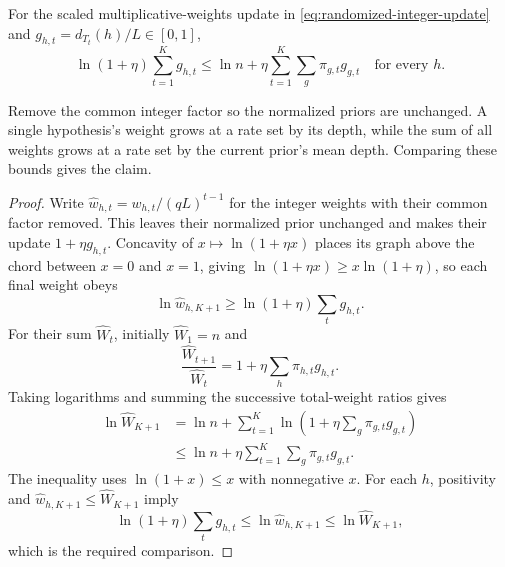 \begin{claim}
\label{clm:randomized-weight-growth}
For the scaled multiplicative-weights update in
\eqref{eq:randomized-integer-update} and
$g_{h,t}=d_{T_t}(h)/L\in[0,1]$,
\[
 \ln(1+\eta)\sum_{t=1}^Kg_{h,t}
 \le\ln n+\eta\sum_{t=1}^K\sum_g\pi_{g,t}g_{g,t}
 \quad\text{for every }h.
\]
\end{claim}
\begin{proofstrategy}
Remove the common integer factor so the normalized priors are
unchanged. A single hypothesis's weight grows at a rate set by its
depth, while the sum of all weights grows at a rate set by the current
prior's mean depth. Comparing these bounds gives the claim.
\end{proofstrategy}
\begin{proof}
Write $\widehat w_{h,t}=w_{h,t}/(qL)^{t-1}$ for the integer weights
with their common factor removed. This leaves their normalized
prior unchanged and makes their update $1+\eta g_{h,t}$.
Concavity of $x\mapsto\ln(1+\eta x)$ places its graph above the
chord between $x=0$ and $x=1$, giving
$\ln(1+\eta x)\ge x\ln(1+\eta)$, so each final weight obeys
\[
 \ln\widehat w_{h,K+1}\ge\ln(1+\eta)\sum_tg_{h,t}.
\]
For their sum $\widehat W_t$, initially $\widehat W_1=n$ and
\[
 \frac{\widehat W_{t+1}}{\widehat W_t}
    =1+\eta\sum_h\pi_{h,t}g_{h,t}.
\]
Taking logarithms and summing the successive total-weight ratios gives
\[
\begin{aligned}
 \ln\widehat W_{K+1}
 &=\ln n+\sum_{t=1}^K
          \ln\left(1+\eta\sum_g\pi_{g,t}g_{g,t}\right)\\
 &\le\ln n+\eta\sum_{t=1}^K\sum_g\pi_{g,t}g_{g,t}.
\end{aligned}
\]
The inequality uses $\ln(1+x)\le x$ with nonnegative $x$.
For each $h$, positivity and
$\widehat w_{h,K+1}\le\widehat W_{K+1}$ imply
\[
 \ln(1+\eta)\sum_tg_{h,t}
 \le\ln\widehat w_{h,K+1}
 \le\ln\widehat W_{K+1},
\]
which is the required comparison.
\end{proof}

